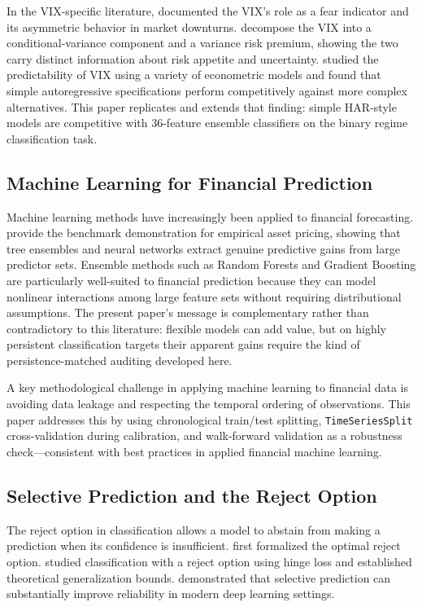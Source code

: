 \documentclass[12pt]{article}
\begin{document}
In the VIX-specific literature, \citet{whaley2009} documented the VIX's role as a fear indicator
and its asymmetric behavior in market downturns. \citet{bekaert2014} decompose the VIX into a
conditional-variance component and a variance risk premium, showing the two carry distinct
information about risk appetite and uncertainty. \citet{fernandes2014} studied the predictability
of VIX using a variety of econometric models and found that simple autoregressive specifications
perform competitively against more complex alternatives. This paper replicates and extends that
finding: simple HAR-style models are competitive with 36-feature ensemble classifiers on the
binary regime classification task.

\subsection{Machine Learning for Financial Prediction}

Machine learning methods have increasingly been applied to financial forecasting.
\citet{gu2020} provide the benchmark demonstration for empirical asset pricing, showing that
tree ensembles and neural networks extract genuine predictive gains from large predictor sets.
Ensemble methods such as Random Forests \citep{breiman2001} and Gradient Boosting are
particularly well-suited to financial prediction because they can model nonlinear interactions
among large feature sets without requiring distributional assumptions. The present paper's
message is complementary rather than contradictory to this literature: flexible models can add
value, but on highly persistent classification targets their apparent gains require the kind
of persistence-matched auditing developed here.

A key methodological challenge in applying machine learning to financial data is avoiding data
leakage and respecting the temporal ordering of observations. This paper addresses this by using
chronological train/test splitting, \texttt{TimeSeriesSplit} cross-validation during calibration,
and walk-forward validation as a robustness check---consistent with best practices in applied
financial machine learning.

\subsection{Selective Prediction and the Reject Option}

The reject option in classification allows a model to abstain from making a prediction when its
confidence is insufficient. \citet{chow1970} first formalized the optimal reject option.
\citet{bartlett2008} studied classification with a reject option using hinge loss and established
theoretical generalization bounds. \citet{geifman2017} demonstrated that selective prediction
can substantially improve reliability in modern deep learning settings.
\end{document}
